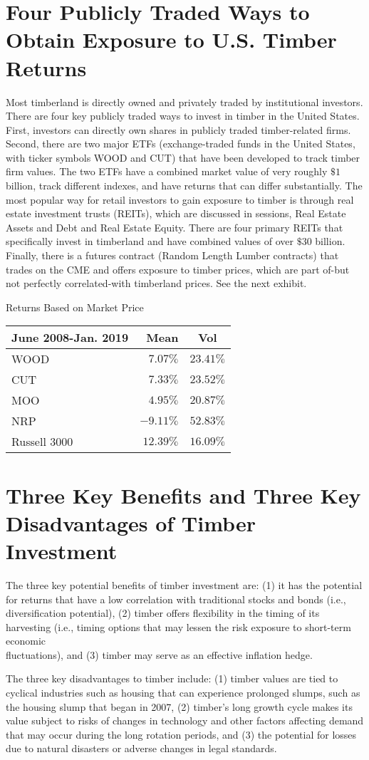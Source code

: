 \documentclass[11pt]{article}
\begin{document}
\section*{Four Publicly Traded Ways to Obtain Exposure to U.S. Timber Returns}
Most timberland is directly owned and privately traded by institutional investors. There are four key publicly traded ways to invest in timber in the United States. First, investors can directly own shares in publicly traded timber-related firms. Second, there are two major ETFs (exchange-traded funds in the United States, with ticker symbols WOOD and CUT) that have been developed to track timber firm values. The two ETFs have a combined market value of very roughly $\$ 1$ billion, track different indexes, and have returns that can differ substantially. The most popular way for retail investors to gain exposure to timber is through real estate investment trusts (REITs), which are discussed in sessions, Real Estate Assets and Debt and Real Estate Equity. There are four primary REITs that specifically invest in timberland and have combined values of over $\$ 30$ billion. Finally, there is a futures contract (Random Length Lumber contracts) that trades on the CME and offers exposure to timber prices, which are part of-but not perfectly correlated-with timberland prices. See the next exhibit.

Returns Based on Market Price

\begin{center}
\begin{tabular}{|lrc|}
\hline
June 2008-Jan. 2019 & Mean & Vol \\
\hline
WOOD & $7.07 \%$ & $23.41 \%$ \\
CUT & $7.33 \%$ & $23.52 \%$ \\
MOO & $4.95 \%$ & $20.87 \%$ \\
NRP & $-9.11 \%$ & $52.83 \%$ \\
Russell 3000 & $12.39 \%$ & $16.09 \%$ \\
\hline
\end{tabular}
\end{center}

\section*{Three Key Benefits and Three Key Disadvantages of Timber Investment}
The three key potential benefits of timber investment are: (1) it has the potential for returns that have a low correlation with traditional stocks and bonds (i.e., diversification potential), (2) timber offers flexibility in the timing of its harvesting (i.e., timing options that may lessen the risk exposure to short-term economic\\
fluctuations), and (3) timber may serve as an effective inflation hedge.

The three key disadvantages to timber include: (1) timber values are tied to cyclical industries such as housing that can experience prolonged slumps, such as the housing slump that began in 2007, (2) timber's long growth cycle makes its value subject to risks of changes in technology and other factors affecting demand that may occur during the long rotation periods, and (3) the potential for losses due to natural disasters or adverse changes in legal standards.
\end{document}
